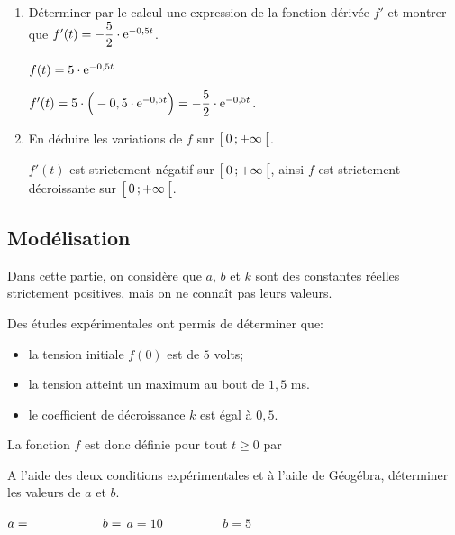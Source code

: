 \begin{enumerate}[series=monDS, resume]
    \item Déterminer par le calcul une expression de la fonction dérivée $f'$ et montrer que $f'(t)=-\dfrac{5}{2}\cdot \mathrm{e}^{-0,5t}$.
    \begin{blocvisiblex}[height=3]
    {\quad}
    $f(t)= 5 \cdot \mathrm{e}^{-0,5t}$

    $f'(t)= 5 \cdot \Big(-0,5\cdot \mathrm{e}^{-0,5t}\Big)=-\dfrac{5}{2}\cdot \mathrm{e}^{-0,5t}$.
    \end{blocvisiblex}
    \medskip
    \item En déduire les variations de $f$ sur $\bigl[ \, 0 \, ; +\infty \,\bigl[$.
    \begin{blocvisiblex}[height=3]
    {\quad}
    $f'(t)$ est strictement négatif sur $\bigl[ \, 0 \, ; +\infty \,\bigl[$, ainsi $f$ est strictement décroissante sur $\bigl[ \, 0 \, ; +\infty \,\bigl[$.
    \end{blocvisiblex}

\end{enumerate}


\subsection*{Modélisation}

Dans cette partie, on considère que $a$, $b$ et $k$ sont des constantes réelles strictement positives, mais on ne connaît pas leurs valeurs.

Des études expérimentales ont permis de déterminer que:
\begin{itemize}
    \item la tension initiale $f(0)$ est de $5$ volts;
    \item la tension atteint un maximum au bout de $1,5$ ms.
    \item le coefficient de décroissance $k$ est égal à $0,5$.
\end{itemize}

La fonction $f$ est donc définie pour tout $t\geq 0$ par 

\bigskip

\begin{enumerate}[series=monDS, resume]
    \begin{minipage}{0.48\textwidth}
    \item A l'aide des deux conditions expérimentales et à l'aide de Géogébra, déterminer les valeurs de $a$ et $b$.
\end{minipage}\hfill{}
\begin{minipage}{0.45\textwidth}
    \begin{blocvisiblex}[height=1.2]
    {$a=\dotfill \hspace{2cm} b=\dotfill$}
    $a=10 \hspace{2cm} b=5$
    \end{blocvisiblex}
\end{minipage}
    \appelprof{}
\end{enumerate}

